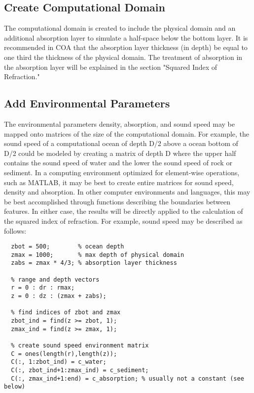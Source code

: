 \documentclass[12pt]{article}
\begin{document}
\subsection{Create Computational Domain}
The computational domain is created to include the physical domain and
an additional absorption layer to simulate a half-space below the bottom
layer.  It is recommended in COA that the absorption layer thickness (in
depth) be equal to one third the thickness of the physical domain.  The
treatment of absorption in the absorption layer will be explained in the
section "Squared Index of Refraction." 

\subsection{Add Environmental Parameters}
The environmental parameters density, absorption, and sound speed may be
mapped onto matrices of the size of the computational domain.  For
example, the sound speed of a computational ocean of depth D/2 above a
ocean bottom of D/2 could be modeled by creating a matrix of depth D
where the upper half contains the sound speed of water and the lower the
sound speed of rock or sediment.  In a computing environment optimized
for element-wise operations, such as MATLAB, it may be best to create
entire matrices for sound speed, density and absorption.  In other
computer environments and languages, this may be best accomplished
through functions describing the boundaries between features.  In either
case, the results will be directly applied to the calculation of the
squared index of refraction.  For example, sound speed may be described
as follows:

\begin{verbatim}
  zbot = 500;        % ocean depth
  zmax = 1000;       % max depth of physical domain
  zabs = zmax * 4/3; % absorption layer thickness

  % range and depth vectors
  r = 0 : dr : rmax;
  z = 0 : dz : (zmax + zabs);

  % find indices of zbot and zmax
  zbot_ind = find(z >= zbot, 1);
  zmax_ind = find(z >= zmax, 1);

  % create sound speed environment matrix
  C = ones(length(r),length(z));
  C(:, 1:zbot_ind) = c_water;
  C(:, zbot_ind+1:zmax_ind) = c_sediment;
  C(:, zmax_ind+1:end) = c_absorption; % usually not a constant (see below)
\end{verbatim}
\end{document}
